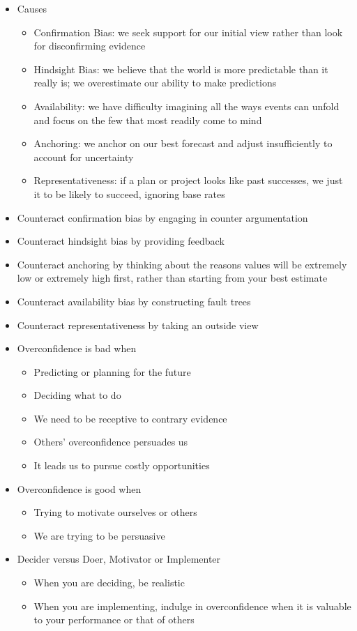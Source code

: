 \documentclass[12pt]{article}
\begin{document}
\begin{itemize}
\item Causes \begin{itemize} 
\item Confirmation Bias: we seek support for our initial view rather than look for disconfirming evidence 
\item Hindsight Bias: we believe that the world is more predictable than it really is; we overestimate our ability to make predictions 
\item Availability: we have difficulty imagining all the ways events can unfold and focus on the few that most readily come to mind 
\item Anchoring: we anchor on our best forecast and adjust insufficiently to account for uncertainty 
\item Representativeness: if a plan or project looks like past successes, we just it to be likely to succeed, ignoring base rates \end{itemize} 
\item Counteract confirmation bias by engaging in counter argumentation 
\item Counteract hindsight bias by providing feedback 
\item Counteract anchoring by thinking about the reasons values will be extremely low or extremely high first, rather than starting from your best estimate 
\item Counteract availability bias by constructing fault trees 
\item Counteract representativeness by taking an outside view 
\item Overconfidence is bad when \begin{itemize} 
\item Predicting or planning for the future
\item Deciding what to do 
\item We need to be receptive to contrary evidence 
\item Others' overconfidence persuades us 
\item It leads us to pursue costly opportunities \end{itemize} 
\item Overconfidence is good when \begin{itemize} 
\item Trying to motivate ourselves or others 
\item We are trying to be persuasive \end{itemize} 
\item Decider versus Doer, Motivator or Implementer \begin{itemize} 
\item When you are deciding, be realistic 
\item When you are implementing, indulge in overconfidence when it is valuable to your performance or that of others \end{itemize} 
\end{itemize}
\newpage
\end{document}
